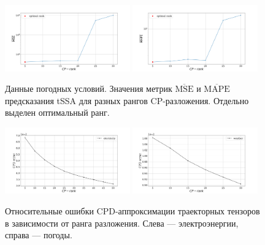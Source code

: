 	\begin{figure}[h]
		\centering
		\includegraphics[width=0.48\textwidth, keepaspectratio]{../../experiments/weather/tssa/figs/prediction/MSE_rank.png}
		\includegraphics[width=0.48\textwidth, keepaspectratio]{../../experiments/weather/tssa/figs/prediction/MAPE_rank.png}
		\caption{Данные погодных условий. Значения метрик $ \overline{\text{MSE}} $ и $ \overline{\text{MAPE}} $ предсказания tSSA для разных рангов CP-разложения. Отдельно выделен оптимальный ранг.}\label{fig:mse_mape_weather}
	\end{figure}
	
	\begin{figure}[h]
		\centering
		\includegraphics[width=0.48\textwidth, keepaspectratio]{../../experiments/electricity/tssa/figs/CPD_error.png}
		\includegraphics[width=0.48\textwidth, keepaspectratio]{../../experiments/weather/tssa/figs/CPD_error.png}
		\caption{Относительные ошибки CPD-аппроксимации траекторных тензоров в зависимости от ранга разложения. Слева --- электроэнергии, справа --- погоды.}\label{fig:cpd_errors}
	\end{figure}
	

